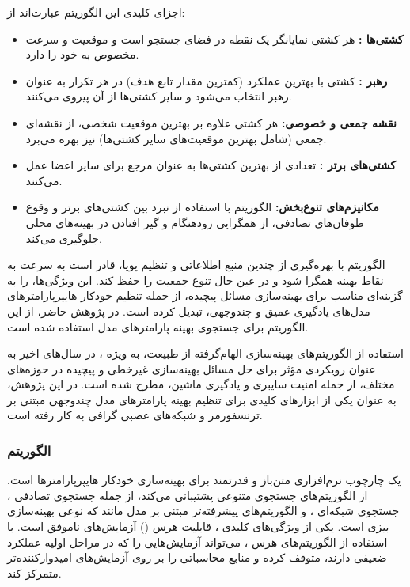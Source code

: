 اجزای کلیدی این الگوریتم عبارت‌اند از:
\begin{itemize}
    \renewcommand{\labelitemi}{\lr{$\bullet$}}
    \item \textbf{کشتی‌ها :} هر کشتی نمایانگر یک نقطه در فضای جستجو است و موقعیت و سرعت مخصوص به خود را دارد.
    \item \textbf{رهبر :} کشتی با بهترین عملکرد (کمترین مقدار تابع هدف) در هر تکرار به عنوان رهبر انتخاب می‌شود و سایر کشتی‌ها از آن پیروی می‌کنند.
    \item \textbf{نقشه جمعی و خصوصی:} هر کشتی علاوه بر بهترین موقعیت شخصی، از نقشه‌ای جمعی (شامل بهترین موقعیت‌های سایر کشتی‌ها) نیز بهره می‌برد.
    \item \textbf{کشتی‌های برتر :} تعدادی از بهترین کشتی‌ها به عنوان مرجع برای سایر اعضا عمل می‌کنند.
    \item \textbf{مکانیزم‌های تنوع‌بخش:} الگوریتم با استفاده از نبرد بین کشتی‌های برتر و وقوع طوفان‌های تصادفی، از همگرایی زودهنگام و گیر افتادن در بهینه‌های محلی جلوگیری می‌کند.
\end{itemize}

الگوریتم  با بهره‌گیری از چندین منبع اطلاعاتی و تنظیم پویا، قادر است به سرعت به نقاط بهینه همگرا شود و در عین حال تنوع جمعیت را حفظ کند. این ویژگی‌ها،  را به گزینه‌ای مناسب برای بهینه‌سازی مسائل پیچیده، از جمله تنظیم خودکار هایپرپارامترهای مدل‌های یادگیری عمیق و چندوجهی، تبدیل کرده است. در پژوهش حاضر، از این الگوریتم برای جستجوی بهینه پارامترهای مدل استفاده شده است.

استفاده از الگوریتم‌های بهینه‌سازی الهام‌گرفته از طبیعت، به ویژه ، در سال‌های اخیر به عنوان رویکردی مؤثر برای حل مسائل بهینه‌سازی غیرخطی و پیچیده در حوزه‌های مختلف، از جمله امنیت سایبری و یادگیری ماشین، مطرح شده است. در این پژوهش،  به عنوان یکی از ابزارهای کلیدی برای تنظیم بهینه پارامترهای مدل چندوجهی مبتنی بر ترنسفورمر و شبکه‌های عصبی گرافی به کار رفته است.

\subsubsection{الگوریتم }
 \cite{Optuna2019} یک چارچوب  نرم‌افزاری متن‌باز و قدرتمند برای بهینه‌سازی خودکار هایپرپارامترها است.  از الگوریتم‌های جستجوی متنوعی پشتیبانی می‌کند، از جمله جستجوی تصادفی ، جستجوی شبکه‌ای ، و الگوریتم‌های پیشرفته‌تر مبتنی بر مدل مانند  که نوعی بهینه‌سازی بیزی است. یکی از ویژگی‌های کلیدی ، قابلیت هرس () آزمایش‌های ناموفق است. با استفاده از الگوریتم‌های هرس ،  می‌تواند آزمایش‌هایی را که در مراحل اولیه عملکرد ضعیفی دارند، متوقف کرده و منابع محاسباتی را بر روی آزمایش‌های امیدوارکننده‌تر متمرکز کند.

